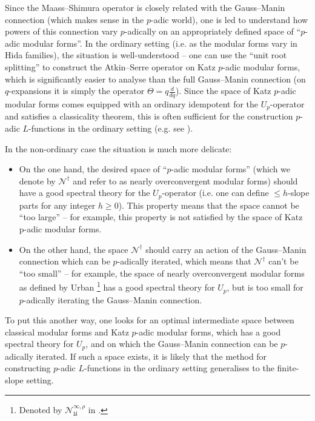 \documentclass[10pt, oneside]{amsart}
\numberwithin{equation}{subsection}
\theoremstyle{definition}
\theoremstyle{remark}
\begin{document}
Since the Maass--Shimura operator is closely related with the Gauss--Manin connection (which makes sense in the $p$-adic world), one is led to understand how powers of this connection vary $p$-adically on an appropriately defined space of ``$p$-adic modular forms''. In the ordinary setting (i.e. as the modular forms vary in Hida families), the situation is well-understood -- one can use the ``unit root splitting'' to construct the Atkin--Serre operator on Katz $p$-adic modular forms, which is significantly easier to analyse than the full Gauss--Manin connection (on $q$-expansions it is simply the operator $\Theta = q \frac{d}{dq}$). Since the space of Katz $p$-adic modular forms comes equipped with an ordinary idempotent for the $U_p$-operator and satisfies a classicality theorem, this is often sufficient for the construction $p$-adic $L$-functions in the ordinary setting (e.g. see \cite{DarmonRotgerGrossZagier1}).

In the non-ordinary case the situation is much more delicate:
\begin{itemize} 
\item On the one hand, the desired space of ``$p$-adic modular forms'' (which we denote by $\mathscr{N}^{\dagger}$ and refer to as nearly overconvergent modular forms) should have a good spectral theory for the $U_p$-operator (i.e. one can define $\leq h$-slope parts for any integer $h \geq 0$). This property means that the space cannot be ``too large'' -- for example, this property is not satisfied by the space of Katz p-adic modular forms.
\item On the other hand, the space $\mathscr{N}^{\dagger}$ should carry an action of the Gauss--Manin connection which can be $p$-adically iterated, which means that $\mathscr{N}^{\dagger}$ can't be ``too small'' -- for example, the space of nearly overconvergent modular forms as defined by Urban \cite{Urban}\footnote{Denoted by $\mathcal{N}^{\infty, \rho}_{\mathfrak{U}}$ in \cite[\S 3.3]{Urban}.} has a good spectral theory for $U_p$, but is too small for $p$-adically iterating the Gauss--Manin connection.
\end{itemize}
To put this another way, one looks for an optimal intermediate space between classical modular forms and Katz $p$-adic modular forms, which has a good spectral theory for $U_p$, and on which the Gauss--Manin connection can be $p$-adically iterated. If such a space exists, it is likely that the method for constructing $p$-adic $L$-functions in the ordinary setting generalises to the finite-slope setting.
\end{document}
